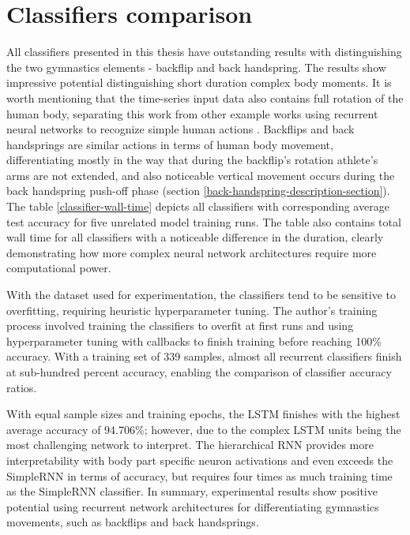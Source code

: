 \begin{comment}

\end{comment}

\section{Classifiers comparison}

All classifiers presented in this thesis have outstanding results with distinguishing the two gymnastics elements - backflip and back handspring. The results show impressive potential distinguishing short duration complex body moments. It is worth mentioning that the time-series input data also contains full rotation of the human body, separating this work from other example works using recurrent neural networks to recognize simple human actions \cite{sawant2020human}. Backflips and back handsprings are similar actions in terms of human body movement, differentiating mostly in the way that during the backflip's rotation athlete's arms are not extended, and also noticeable vertical movement occurs during the back handspring push-off phase (section \ref{back-handspring-description-section}). The table \ref{classifier-wall-time} depicts all classifiers with corresponding average test accuracy for five unrelated model training runs. The table also contains total wall time for all classifiers with a noticeable difference in the duration, clearly demonstrating how more complex neural network architectures require more computational power.

With the dataset used for experimentation, the classifiers tend to be sensitive to overfitting, requiring heuristic hyperparameter tuning. The author's training process involved training the classifiers to overfit at first runs and using hyperparameter tuning with callbacks to finish training before reaching 100\% accuracy. With a training set of 339 samples, almost all recurrent classifiers finish at sub-hundred percent accuracy, enabling the comparison of classifier accuracy ratios.

With equal sample sizes and training epochs, the LSTM finishes with the highest average accuracy of 94.706\%; however, due to the complex  LSTM units being the most challenging network to interpret. The hierarchical RNN provides more interpretability with body part specific neuron activations and even exceeds the SimpleRNN in terms of accuracy, but requires four times as much training time as the SimpleRNN classifier. In summary, experimental results show positive potential using recurrent network architectures for differentiating gymnastics movements, such as backflips and back handsprings.

